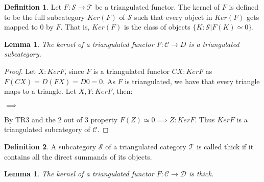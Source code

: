 \documentclass[12pt]{article}
\newtheorem{lemma}[theorem]{Lemma}
\theoremstyle{definition}
\newtheorem{definition}{Definition}[section]
\theoremstyle{remark}
\begin{document}
            \begin{definition}
                Let $F : \mathcal{S} \rightarrow \mathcal{T}$ be a triangulated functor. The kernel of $F$ is defined to be the full subcategory $Ker(F)$ of $\mathcal{S}$ such that every object in $Ker(F)$ gets mapped to $0$ by $F$. That is, $Ker(F)$ is the class of objects $\{K : \mathcal{S} | F(K)\simeq 0\}$.
            \end{definition}

            \begin{lemma}
                The kernel of a triangulated functor $F:\mathcal{C}\rightarrow{D}$ is a triangulated subcategory.
            \end{lemma}

            \begin{proof}
                Let $X:KerF$, since $F$ is a triangulated functor $CX:KerF$ as $F(CX)=D(FX)=D0=0$. As $F$ is triangulated, we have that every triangle maps to a triangle. Let $X,Y:KerF$, then:
                \begin{center}
                    $\implies$
                \end{center}
                By TR3 and the 2 out of 3 property $F(Z)\simeq 0 \implies Z:KerF$. Thus $KerF$ is a triangulated subcategory of $\mathcal{C}$.
            \end{proof}

            \begin{definition}
                A subcategory $\mathcal{S}$ of a triangulated category $\mathcal{T}$ is called thick if it contains all the direct summands of its objects.
            \end{definition}

            \begin{lemma}
                The kernel of a triangulated functor $F:\mathcal{C}\rightarrow\mathcal{D}$ is thick.
            \end{lemma}
\end{document}
